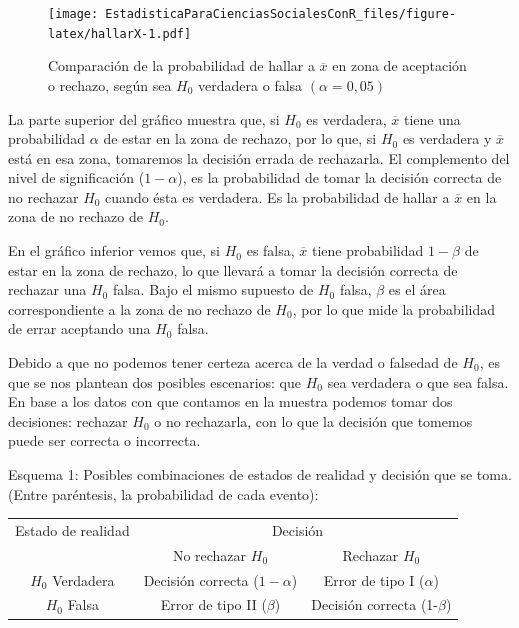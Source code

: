 \documentclass[]{book}
\begin{document}
\begin{figure}
\centering
\texttt{[image: EstadisticaParaCienciasSocialesConR\_files/figure-latex/hallarX-1.pdf]}
\caption{\label{fig:hallarX}Comparación de la probabilidad de hallar a \(\overline{x}\) en zona de aceptación o rechazo, según sea \(H_{0}\) verdadera o falsa \((\alpha = 0,05)\)}
\end{figure}

La parte superior del gráfico muestra que, si \(H_{0}\) es verdadera,
\(\overline{x}\) tiene una probabilidad \(\alpha\) de estar en la zona de rechazo,
por lo que, si \(H_{0}\) es verdadera y \(\overline{x}\) está en esa zona,
tomaremos la decisión errada de rechazarla. El complemento del nivel de
significación (\(1-\alpha\)), es la probabilidad de tomar la decisión correcta de no rechazar \(H_{0}\) cuando ésta es verdadera. Es la probabilidad de hallar a \(\overline{x}\) en la zona de no rechazo de \(H_{0}\).

En el gráfico inferior vemos que, si \(H_{0}\) es falsa, \(\overline{x}\) tiene
probabilidad \(1-\beta\) de estar en la zona de rechazo, lo que llevará a tomar
la decisión correcta de rechazar una \(H_{0}\) falsa. Bajo el mismo supuesto de \(H_{0}\) falsa, \(\beta\) es el área correspondiente a la zona de no rechazo de \(H_{0}\), por lo que mide la probabilidad de errar aceptando una \(H_{0}\) falsa.

Debido a que no podemos tener certeza acerca de la verdad o falsedad de
\(H_{0}\), es que se nos plantean dos posibles escenarios: que \(H_{0}\) sea
verdadera o que sea falsa. En base a los datos con que contamos en la
muestra podemos tomar dos decisiones: rechazar \(H_{0}\) o no rechazarla, con lo que la decisión que tomemos puede ser correcta o incorrecta.

Esquema 1: Posibles combinaciones de estados de realidad y decisión que
se toma. (Entre paréntesis, la probabilidad de cada evento):

\begin{table}[H]
\centering
\begin{tabular}{ccc}
\toprule
\multicolumn{1}{c}{Estado de realidad} & \multicolumn{2}{c}{Decisión} \\
\cmidrule(l{3pt}r{3pt}){1-1} \cmidrule(l{3pt}r{3pt}){2-3}
 & No rechazar $H_0$ & Rechazar $H_0$\\
\midrule
\rowcolor{gray!6}  $H_0$ Verdadera & Decisión correcta ($1-\alpha$) & Error de tipo I ($\alpha$)\\
$H_0$ Falsa & Error de tipo II ($\beta$) & Decisión correcta (1-$\beta$)\\
\bottomrule
\end{tabular}
\end{table}
\end{document}
